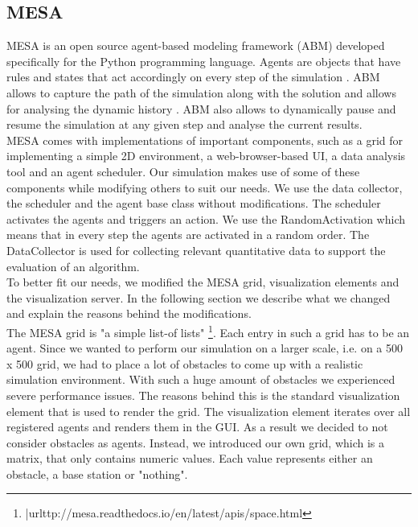 \subsection{MESA}
MESA \cite{masad.2015} is an open source agent-based modeling framework (ABM) developed specifically for the Python programming language.  Agents are objects that have rules and states that act accordingly on every step of the simulation \cite{axtell.2000}. ABM allows to capture the path of the simulation along with the solution and allows for analysing the dynamic history \cite{axtell.2000}. ABM also allows to dynamically pause and resume the simulation at any given step and analyse the current results.\\
MESA comes with implementations of important components, such as a grid for implementing a simple 2D environment, a web-browser-based UI, a data analysis tool and an agent scheduler. Our simulation makes use of some of these components while modifying others to suit our needs. We use the data collector, the scheduler and the agent base class without modifications. The scheduler activates the agents and triggers an action. We use the RandomActivation which means that in every step the agents are activated in a random order. The DataCollector is used for collecting relevant quantitative data to support the evaluation of an algorithm.\\
To better fit our needs, we modified the MESA grid, visualization elements and the visualization server. In the following section we describe what we changed and explain the reasons behind the modifications.\\
The MESA grid is "a simple list-of lists" \footnote{|url{ttp://mesa.readthedocs.io/en/latest/apis/space.html}}. Each entry in such a grid has to be an agent. Since we wanted to perform our simulation on a larger scale, i.e. on a 500 x 500 grid, we had to place a lot of obstacles to come up with a realistic simulation environment. With such a huge amount of obstacles we experienced severe performance issues. The reasons behind this is the standard visualization element that is used to render the grid. The visualization element iterates over all registered agents and renders them in the GUI. As a result we decided to not consider obstacles as agents. Instead, we introduced our own grid, which is a matrix, that only contains numeric values. Each value represents either an obstacle, a base station or "nothing". 
 
